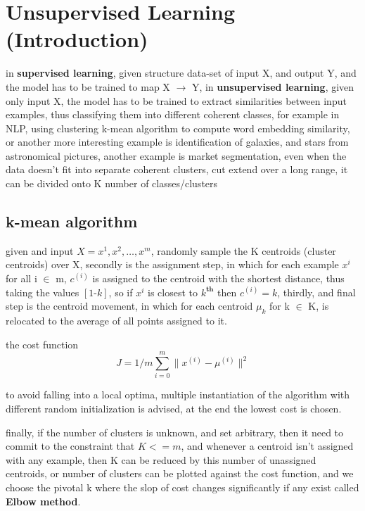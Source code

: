 \documentclass[4apaper,12pt]{book}
\begin{document}
  \section{Unsupervised Learning (Introduction)}
  \begin{description}
  \item in \textbf{supervised learning}, given structure data-set of input X, and output Y, and the model has to be trained to map X $\rightarrow$ Y, in \textbf{unsupervised learning}, given only input X, the model has to be trained to extract similarities between input examples, thus classifying them into different coherent classes, for example in NLP, using clustering k-mean algorithm to compute word embedding similarity, or another more interesting example is identification of galaxies, and stars from astronomical pictures, another example is market segmentation, even when the data doesn't fit into separate coherent clusters, cut extend over a long range, it can be divided onto K number of classes/clusters
    \subsection{k-mean algorithm}
    \begin{description}
    \item given and input $X={x^1,x^2,\dots,x^m}$, randomly sample the K centroids (cluster centroids) over X, secondly is the assignment step, in which for each example $x^i$ for all i $\in$ m, $c^{(i)}$ is assigned  to the centroid with the shortest distance, thus taking the values $[1\text{-}k]$, so if $x^i$ is closest to $k^{\textbf{th}}$ then $c^{(i)}=k$, thirdly, and final step is the centroid movement, in which for each centroid $\mu_k$ for k $\in$ K, is relocated to the average of all points assigned to it.
    \item the cost function $$ J=1/m\sum_{i=0}^m\lVert x^{(i)} - \mu^{(i)} \rVert^2 $$
    \item to avoid falling into a local optima, multiple instantiation of the algorithm with different random initialization is advised, at the end the lowest cost is chosen.
    \item finally, if the number of clusters is unknown, and set arbitrary, then it need to commit to the constraint that $K <= m$, and whenever a centroid isn't assigned with any example, then K can be reduced by this number of unassigned centroids, or number of clusters can be plotted against the cost function, and we choose the pivotal k where the slop of cost changes significantly if any exist called \textbf{Elbow method}.
    \end{description}

\end{description}
\end{document}
